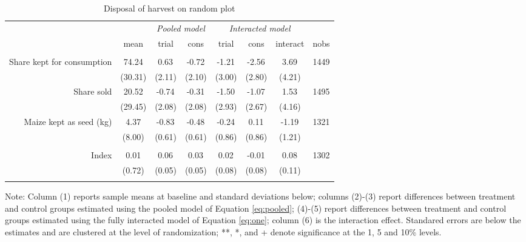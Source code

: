 \documentclass[english]{article}\usepackage[]{graphicx}\usepackage[]{xcolor}
\begin{document}
\begin{sidewaystable}
\caption{Disposal of harvest on random plot\label{disposal}}

\footnotesize
\begin{center}
\begin{tabular}{rccccccc}
\hline\hline
& & \multicolumn{2}{c}{\textit{Pooled model}} & \multicolumn{3}{c}{\textit{Interacted model}} \\
& mean & trial & cons & trial & cons & interact & nobs \\
\hline
\\
Share kept for consumption
& 74.24
& 0.63$^{}$
& -0.72$^{}$ 
& -1.21$^{}$ 
& -2.56$^{}$
& 3.69$^{}$ & 1449 \\

& (30.31) & (2.11)  & (2.10) & (3.00)  & (2.80)  & (4.21)
 \\

Share sold
& 20.52
& -0.74$^{}$
& -0.31$^{}$ 
& -1.50$^{}$ 
& -1.07$^{}$
& 1.53$^{}$ & 1495 \\

& (29.45) & (2.08)  & (2.08) & (2.93)  & (2.67)  & (4.16)
 \\

Maize kept as seed (kg)
& 4.37
& -0.83$^{}$
& -0.48$^{}$ 
& -0.24$^{}$ 
& 0.11$^{}$
& -1.19$^{}$ & 1321 \\

& (8.00) & (0.61)  & (0.61) & (0.86)  & (0.86)  & (1.21)
 \\
\\
Index
& 0.01
& 0.06$^{}$
& 0.03$^{}$ 
& 0.02$^{}$ 
& -0.01$^{}$
& 0.08$^{}$ & 1302 \\

& (0.72) & (0.05)  & (0.05) & (0.08)  & (0.08)  & (0.11)
 \\
\\
\hline\hline
\end{tabular}
\end{center}
\scriptsize
Note: Column (1) reports sample means at baseline and standard deviations below;  columns (2)-(3) report differences between treatment and control groups estimated using the pooled model of Equation  \ref{eq:pooled}; (4)-(5) report differences between treatment and control groups estimated using the fully interacted model of Equation \ref{eq:one}; column (6) is the interaction effect. Standared errors are below the estimates and are clustered at the level of randomization; **, *, and + denote significance at the 1, 5 and 10\% levels.
\end{sidewaystable}
\end{document}

